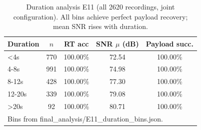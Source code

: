 \begin{table}[t]
\centering
\caption{Duration analysis E11 (all 2620 recordings, joint configuration). All bins achieve perfect payload recovery; mean SNR rises with duration.}
\label{tab:duration-e11}
\scriptsize
\begin{tabular}{lcccc}
\toprule
\textbf{Duration} & \textbf{$n$} & \textbf{RT acc} & \textbf{SNR $\mu$ (dB)} & \textbf{Payload succ.} \\
\midrule
<4s & 770 & 100.00\% & 72.54 & 100.00\% \\
4-8s & 991 & 100.00\% & 74.98 & 100.00\% \\
8-12s & 428 & 100.00\% & 77.30 & 100.00\% \\
12-20s & 339 & 100.00\% & 79.08 & 100.00\% \\
>20s & 92 & 100.00\% & 80.71 & 100.00\% \\
\bottomrule
\multicolumn{5}{l}{\footnotesize Bins from final_analysis/E11_duration_bins.json.}\\
\end{tabular}
\end{table}
